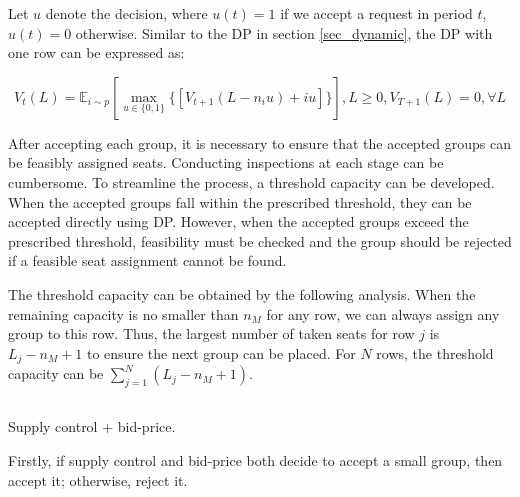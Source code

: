 

Let $u$ denote the decision, where $u(t) = 1$ if we accept a request in period $t$, $u(t) =0$ otherwise. Similar to the DP in section \ref{sec_dynamic}, the DP with one row can be expressed as:

$$V_{t}(L) = \mathbb{E}_{i \sim p} [\max_{u \in \{0,1\}} \{ {[V_{t+1}(L-n_i u)+ i u]}\}], L \geq 0, V_{T+1}(L) =0, \forall L$$





After accepting each group, it is necessary to ensure that the accepted groups can be feasibly assigned seats. Conducting inspections at each stage can be cumbersome. To streamline the process, a threshold capacity can be developed. When the accepted groups fall within the prescribed threshold, they can be accepted directly using DP. However, when the accepted groups exceed the prescribed threshold, feasibility must be checked and the group should be rejected if a feasible seat assignment cannot be found.


The threshold capacity can be obtained by the following analysis. When the remaining capacity is no smaller than $n_{M}$ for any row, we can always assign any group to this row. Thus, the largest number of taken seats for row $j$ is $L_j -n_{M} +1$ to ensure the next group can be placed. For $N$ rows, the threshold capacity can be $\sum_{j=1}^{N} (L_j -n_{M} +1)$.

\subsection{}
Supply control + bid-price.

Firstly, if supply control and bid-price both decide to accept a small group, then accept it; otherwise, reject it.

